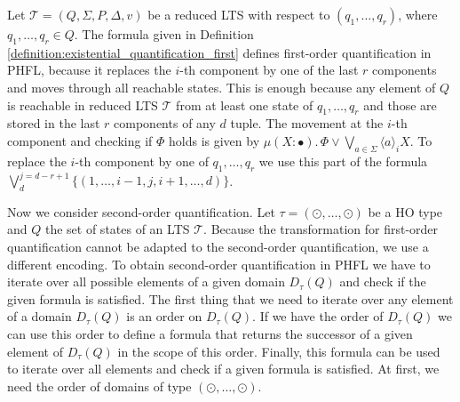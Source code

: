 \begin{observation}
\label{observation:existential_quantification_first}
		Let $\mathcal{T} = (Q, \Sigma, P, \Delta, v)$ be a reduced LTS with respect to $(q_1, \dots, q_r)$, where $q_1, \dots, q_r \in Q$. The formula given in Definition~
		\ref{definition:existential_quantification_first} defines first-order quantification in PHFL, because it replaces the $i$-th component by one of the last $r$ components and moves 
		through all reachable states. This is enough because any element of $Q$ is reachable in reduced LTS $\mathcal{T}$ from at least one state of 
        $q_1, \dots, q_r$ and those are stored in the last $r$ components of any $d$ tuple. The movement at the $i$-th component and checking if $\Phi$ 
        holds is given by $\mu (X \colon \bullet).\,\Phi \vee \bigvee_{a \in \Sigma} \langle a 
        \rangle_{i} X$. To replace the $i$-th component by one of $q_1, \dots, q_r$ 
        we use this part of the formula $\bigvee_{d}^{j=d-r+1} \{(1, \dots, i-1, j, i + 1, \dots, d)\}$.
\end{observation}

Now we consider second-order quantification. Let $\tau = (\odot, \dots, \odot)$ be a HO type and
$Q$ the set of states of an LTS $\mathcal{T}$. Because the transformation for first-order quantification cannot be adapted to the second-order quantification, we use a different encoding. To obtain second-order
quantification in PHFL we have to iterate over all possible elements of a given domain $D_\tau(Q)$ and
check if the given formula is satisfied. The first thing that we need to iterate over any element of a domain
$D_\tau(Q)$ is an order on $D_\tau(Q)$. If we have the order of $D_\tau(Q)$ we can use
this order to define a formula that returns the successor of a given element of $D_\tau(Q)$ in the scope
of this order. Finally, this formula can be used to iterate over all elements and check if a given formula is
satisfied.
At first, we need the order of domains of type $(\odot, \dots, \odot)$.

